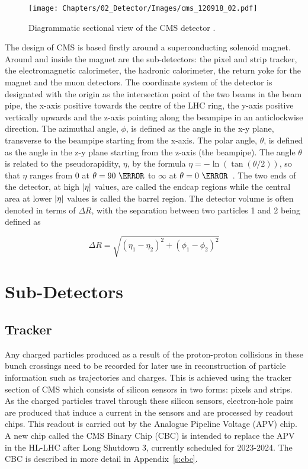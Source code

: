 \begin{figure}[hbtp]
   \centering
     \texttt{[image: Chapters/02\_Detector/Images/cms\_120918\_02.pdf]}\hfill
     \caption[Diagrammatic sectional view of the CMS detector.]{Diagrammatic sectional view of the CMS
     detector
     \cite{Sakuma_sketchup}.}
     \label{fig:CMS_diagram}
 \end{figure}

The design of CMS is based firstly around a superconducting solenoid magnet. Around and inside the magnet are
the sub-detectors: the pixel and strip tracker, the electromagnetic calorimeter, the hadronic calorimeter, the
return yoke for the magnet and the muon detectors. The coordinate system of the detector is designated with
the origin as the intersection point of the two beams in the beam pipe, the x-axis positive towards the centre
of the LHC ring, the y-axis positive vertically upwards and the z-axis pointing along the beampipe in an
anticlockwise direction. The azimuthal angle, $\phi$, is defined as the angle in the x-y plane, transverse to
the beampipe starting from the x-axis. The polar angle, $\theta$, is defined as the angle in the z-y plane
starting from the z-axis (the beampipe). The angle $\theta$ is related to the pseudorapidity, $\eta$, by the
formula $\eta=-\ln(\tan(\theta/2))$, so that $\eta$ ranges from 0 at $\theta=90~\degreeCelsius$ to $\infty$ at
$\theta=0~\degreeCelsius$~\cite{CMS_TDR1}. The two ends of the detector, at high $|\eta|$ values, are called
the endcap regions while the central area at lower $|\eta|$ values is called the barrel region. The detector
volume is often denoted in terms of $\Delta R$, with the separation between two particles 1 and 2 being
defined as

\begin{equation}
\Delta R = \sqrt{(\eta_{1} - \eta_{2})^{2} + (\phi_{1} - \phi_{2})^{2}}
\end{equation}

\section{Sub-Detectors}
\label{s:Subdetectors}

\subsection{Tracker}
\label{ss:Tracker}

Any charged particles produced as a result of the proton-proton collisions in these bunch crossings need to be
recorded for later use in reconstruction of particle information such as trajectories and charges. This is
achieved using the tracker section of CMS which consists of silicon sensors in two forms: pixels and strips.
As the charged particles travel through these silicon sensors, electron-hole pairs are produced that induce a
current in the sensors and are processed by readout chips. This readout is carried out by the Analogue
Pipeline Voltage (APV) chip. A new chip called the CMS Binary Chip (CBC) is intended to replace the APV in the
HL-LHC after Long Shutdown 3, currently scheduled for 2023-2024. The CBC is described in more detail in
Appendix~\ref{s:cbc}.

